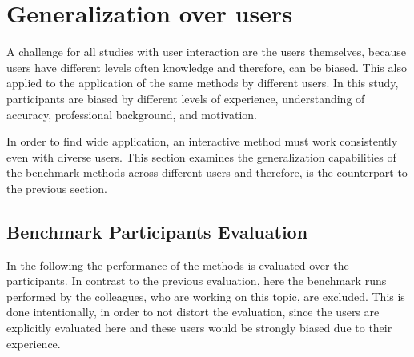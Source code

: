 
\section{Generalization over users}\label{ord:ch5:sec_3_generalization_user}

A challenge for all studies with user interaction are the users themselves, because users have different levels often knowledge and therefore, can be biased.
This also applied to the application of the same methods by different users.
In this study, participants are biased by different levels of experience, understanding of accuracy, professional background, and motivation.

In order to find wide application, an interactive method must work consistently even with diverse users.
This section examines the generalization capabilities of the benchmark methods across different users and therefore, is the counterpart to the previous section.




\subsection{Benchmark Participants Evaluation}\label{ord:ch5:sec3:subsec1}

In the following the performance of the methods is evaluated over the \getNumberBenchmarkParticipants participants.
In contrast to the previous evaluation, here the benchmark runs performed by the colleagues, who are working on this topic, are excluded.
This is done intentionally, in order to not distort the evaluation, since the users are explicitly evaluated here and these users would be strongly biased due to their experience.

